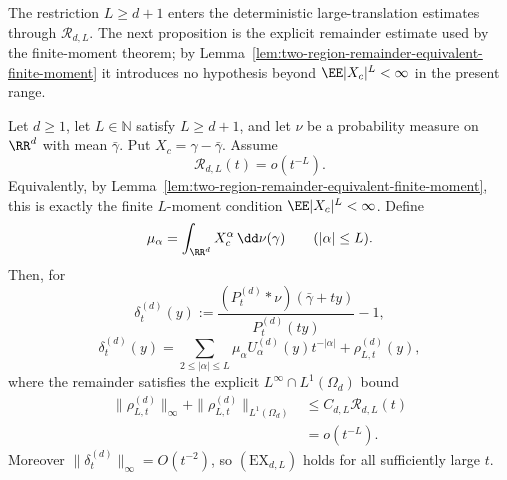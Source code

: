 The restriction \(L\ge d+1\) enters the deterministic large-translation
estimates through \(\mathcal R_{d,L}\).  The next proposition is the explicit
remainder estimate used by the finite-moment theorem; by
Lemma~\ref{lem:two-region-remainder-equivalent-finite-moment} it introduces
no hypothesis beyond \(\EE|X_c|^L<\infty\) in the present range.

\begin{proposition}%
\label{thm:multidimensional-conditional-tail-density-quotient}
Let \(d\ge1\), let \(L\in\mathbb N\) satisfy \(L\ge d+1\), and let \(\nu\) be
a probability measure on \(\RR^d\) with mean \(\bar{\gamma}\).  Put
\(X_c=\gamma-\bar{\gamma}\).  Assume
\[
\mathcal R_{d,L}(t)=o(t^{-L}).
\]
Equivalently, by Lemma~\ref{lem:two-region-remainder-equivalent-finite-moment},
this is exactly the finite \(L\)-moment condition
\(\EE|X_c|^L<\infty\).  Define
\[
\begin{gathered}
\mu_\alpha=\int_{\RR^d}X_c^\alpha\,\dd\nu(\gamma)
\qquad(|\alpha|\le L).
\end{gathered}
\]
Then, for
\[
\delta_t^{(d)}(y):=
\frac{(P_t^{(d)}*\nu)(\bar{\gamma}+ty)}
{P_t^{(d)}(ty)}-1,
\]
\begin{equation}\label{eq:multidim-density-quotient-expansion-main}
\delta_t^{(d)}(y)=
\sum_{2\le|\alpha|\le L}\mu_\alpha U_\alpha^{(d)}(y)t^{-|\alpha|}
+\rho_{L,t}^{(d)}(y),
\end{equation}
where the remainder satisfies the explicit \(L^\infty\cap L^1(\Omega_d)\)
bound
\begin{equation}\label{eq:multidim-density-quotient-explicit-remainder}
\begin{aligned}
\|\rho_{L,t}^{(d)}\|_\infty+
\|\rho_{L,t}^{(d)}\|_{L^1(\Omega_d)}
&\le C_{d,L}\mathcal R_{d,L}(t)  \\
&=o(t^{-L}).
\end{aligned}
\end{equation}
Moreover \(\|\delta_t^{(d)}\|_\infty=O(t^{-2})\), so
\((\mathrm{EX}_{d,L})\) holds for all sufficiently large \(t\).
\end{proposition}

